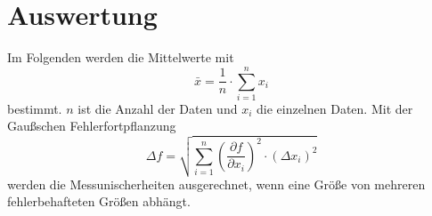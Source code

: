 \nocite{anleitungV302}
\section{Auswertung}
\label{sec:Auswertung}
Im Folgenden werden die Mittelwerte mit 
$$\bar{x} = \frac{1}{n} \cdot \sum_{i = 1}^{n}x_i$$ bestimmt. $n$ ist die Anzahl der Daten und $x_i$ die einzelnen Daten.
Mit der Gaußschen Fehlerfortpflanzung
$$\Delta f = \sqrt{\sum_{i = 1}^{n} \left( \frac{\partial f}{\partial x_i} \right)^2 \cdot \left(\Delta x_i \right)^2}$$
werden die Messunischerheiten ausgerechnet, wenn eine Größe von mehreren fehlerbehafteten Größen abhängt.
